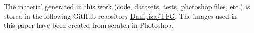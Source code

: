 The material generated in this work (code, datasets, tests, photoshop files, etc.) is stored in the following GitHub repository \href{https://github.com/Danipiza/TFG}{Danipiza/TFG}. The images used in this paper have been created from scratch in Photoshop.















